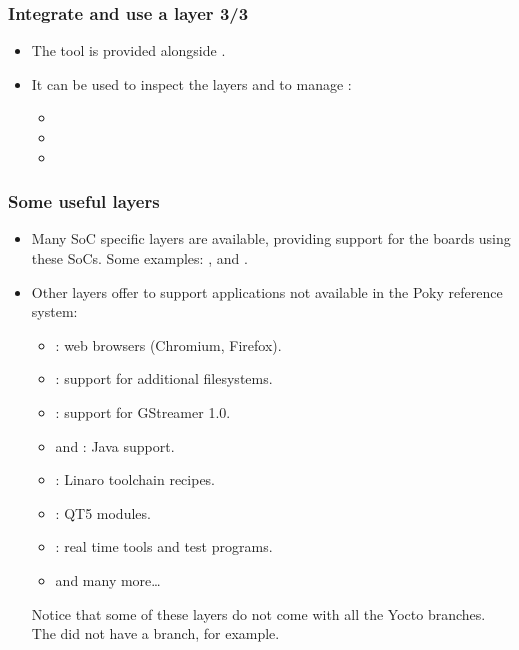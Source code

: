 \begin{frame}
  \frametitle{Integrate and use a layer 3/3}
  \begin{itemize}
    \item The  tool is provided alongside
      .
    \item It can be used to inspect the layers and to manage
      :
    \begin{itemize}
      \item {}
      \item {}
      \item {}
    \end{itemize}
  \end{itemize}
\end{frame}

\begin{frame}
  \frametitle{Some useful layers}
  \begin{itemize}
    \item Many SoC specific layers are available, providing support
      for the boards using these SoCs. Some examples: ,
       and .
    \item Other layers offer to support applications not available in
      the Poky reference system:
    \begin{itemize}
      \item {}: web browsers (Chromium, Firefox).
      \item {}: support for additional
        filesystems.
      \item {}: support for GStreamer 1.0.
      \item {} and : Java support.
      \item {}: Linaro toolchain recipes.
      \item {}: QT5 modules.
      \item {}: real time tools and test programs.
      \item {} and many more\dots
    \end{itemize}
    Notice that some of these layers do not come with all the Yocto
    branches. The  did not have a  branch,
    for example.
  \end{itemize}
\end{frame}

